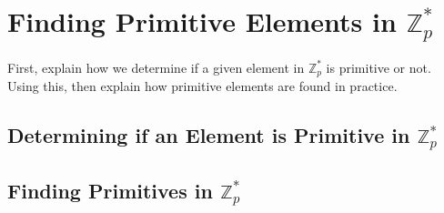 \documentclass[12pt, letterpaper]{article}
\begin{document}
\section{Finding Primitive Elements in $\mathbb{Z}_p^*$}

First, explain how we determine if a given element in $\mathbb{Z}_p^*$ is primitive or not. 
Using this, then explain how primitive elements are found in practice. 

\subsection{Determining if an Element is Primitive in  $\mathbb{Z}_p^*$}


\subsection{Finding Primitives in  $\mathbb{Z}_p^*$}
\end{document}
